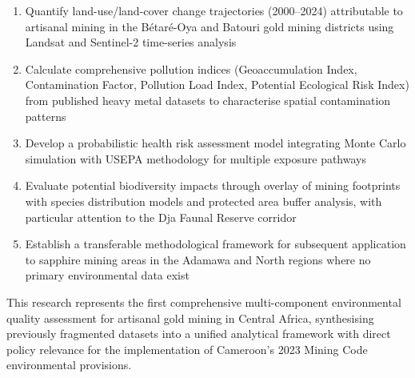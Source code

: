 \documentclass[preprint,12pt,number]{elsarticle}
\begin{document}
\begin{enumerate}
\item Quantify land-use/land-cover change trajectories (2000--2024) attributable to artisanal mining in the B\'{e}tar\'{e}-Oya and Batouri gold mining districts using Landsat and Sentinel-2 time-series analysis
\item Calculate comprehensive pollution indices (Geoaccumulation Index, Contamination Factor, Pollution Load Index, Potential Ecological Risk Index) from published heavy metal datasets to characterise spatial contamination patterns
\item Develop a probabilistic health risk assessment model integrating Monte Carlo simulation with USEPA methodology for multiple exposure pathways
\item Evaluate potential biodiversity impacts through overlay of mining footprints with species distribution models and protected area buffer analysis, with particular attention to the Dja Faunal Reserve corridor
\item Establish a transferable methodological framework for subsequent application to sapphire mining areas in the Adamawa and North regions where no primary environmental data exist
\end{enumerate}

This research represents the first comprehensive multi-component environmental quality assessment for artisanal gold mining in Central Africa, synthesising previously fragmented datasets into a unified analytical framework with direct policy relevance for the implementation of Cameroon's 2023 Mining Code environmental provisions.
\end{document}
